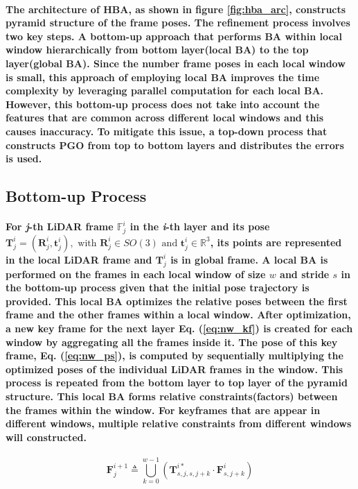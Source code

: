 \paragraph{\textnormal{The architecture of HBA, as shown in figure \ref{fig:hba_arc}, constructs pyramid structure of the frame poses. The refinement process involves two key steps. A bottom-up approach that performs BA within local window hierarchically from bottom layer(local BA) to the top layer(global BA).  Since the number frame poses in each local window is small, this approach of employing local BA improves the time complexity by leveraging parallel computation for each local BA. However, this bottom-up process does not take into account the features that are common across different local windows and this causes inaccuracy. To mitigate this issue, a top-down process that constructs PGO from top to bottom layers and distributes the errors is used. 
}}


\subsection{Bottom-up Process}
\paragraph{\textnormal{For \textit{j}-th LiDAR frame $\mathbb{F}^i_j$ in the \textit{i}-th layer and its pose $\mathbf{T}^i_j = (\mathbf{R}^i_j, \mathbf{t}^i_j), \text{ with } \mathbf{R}^i_j \in SO(3) \text{ and } \mathbf{t}^i_j \in \mathbb{R}^3$, its points are represented in the local LiDAR frame and $\mathbf{T}^i_j$ is in global frame. A local BA is performed on the frames in each local window of size $\mathit{w}$ and stride $\mathit{s}$ in the bottom-up process given that the initial pose trajectory is provided. This local BA optimizes the relative poses between the first frame and the other frames within a local window. After optimization, a new key frame for the next layer Eq. (\ref{eq:nw_kf}) is created for each window by aggregating all the frames inside it. The pose of this key frame, Eq. (\ref{eq:nw_ps}), is computed by sequentially multiplying the optimized poses of the individual LiDAR frames in the window. This process is repeated from the bottom layer to top layer of the pyramid structure. This local BA forms relative constraints(factors) between the frames within the window. For keyframes that are appear in different windows, multiple relative constraints from different windows will constructed.
}}


\begin{equation}
	\mathbf{F}^{i+1}_j \triangleq \bigcup_{k=0}^{w-1} \left( \mathbf{T}^{i*}_{s,j,s,j+k} \cdot \mathbf{F}^i_{s,j+k} \right)
	\label{eq:nw_kf}
\end{equation}



